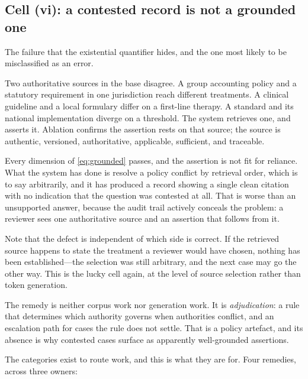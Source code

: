 \documentclass[11pt]{article}
\theoremstyle{plain}
\theoremstyle{definition}
\begin{document}
\subsection{Cell (vi): a contested record is not a grounded one}
\label{sec:contested}

The failure that the existential quantifier hides, and the one most likely to be
misclassified as an error.

Two authoritative sources in the base disagree. A group accounting policy and a
statutory requirement in one jurisdiction reach different treatments. A clinical
guideline and a local formulary differ on a first-line therapy. A standard and its
national implementation diverge on a threshold. The system retrieves one, and asserts
it. Ablation confirms the assertion rests on that source; the source is authentic,
versioned, authoritative, applicable, sufficient, and traceable.

Every dimension of \eqref{eq:grounded} passes, and the assertion is not fit for
reliance. What the system has done is resolve a policy conflict by retrieval order,
which is to say arbitrarily, and it has produced a record showing a single clean
citation with no indication that the question was contested at all. That is worse than
an unsupported answer, because the audit trail actively conceals the problem: a
reviewer sees one authoritative source and an assertion that follows from it.

Note that the defect is independent of which side is correct. If the retrieved source
happens to state the treatment a reviewer would have chosen, nothing has been
established---the selection was still arbitrary, and the next case may go the other
way. This is the lucky cell again, at the level of source selection rather than token
generation.

The remedy is neither corpus work nor generation work. It is \emph{adjudication}: a
rule that determines which authority governs when authorities conflict, and an
escalation path for cases the rule does not settle. That is a policy artefact, and its
absence is why contested cases surface as apparently well-grounded assertions.

The categories exist to route work, and this is what they are for. Four remedies,
across three owners:
\label{sec:remedies}
\end{document}
